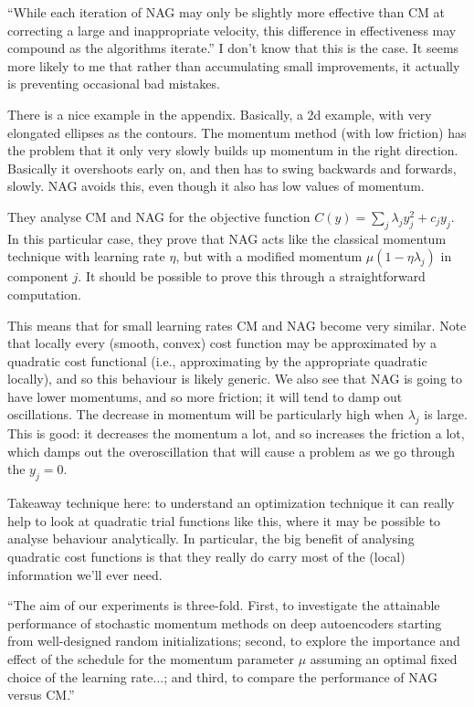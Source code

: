 \documentclass[12pt]{report}
\begin{document}
``While each iteration of NAG may only be slightly more effective than
CM at correcting a large and inappropriate velocity, this difference
in effectiveness may compound as the algorithms iterate.''  I don't
know that this is the case.  It seems more likely to me that rather
than accumulating small improvements, it actually is preventing
occasional bad mistakes.

There is a nice example in the appendix.  Basically, a 2d example,
with very elongated ellipses as the contours.  The momentum method
(with low friction) has the problem that it only very slowly builds up
momentum in the right direction.  Basically it overshoots early on,
and then has to swing backwards and forwards, slowly.  NAG avoids
this, even though it also has low values of momentum.

They analyse CM and NAG for the objective function $C(y) = \sum_j
\lambda_j y_j^2+ c_j y_j$.  In this particular case, they prove that
NAG acts like the classical momentum technique with learning rate
$\eta$, but with a modified momentum $\mu(1-\eta \lambda_j)$ in
component $j$.  It should be possible to prove this through a
straightforward computation.

This means that for small learning rates CM and NAG become very
similar.  Note that locally every (smooth, convex) cost function may
be approximated by a quadratic cost functional (i.e., approximating by
the appropriate quadratic locally), and so this behaviour is likely
generic.  We also see that NAG is going to have lower momentums, and
so more friction; it will tend to damp out oscillations.  The decrease
in momentum will be particularly high when $\lambda_j$ is large.  This
is good: it decreases the momentum a lot, and so increases the
friction a lot, which damps out the overoscillation that will cause a
problem as we go through the $y_j = 0$.

Takeaway technique here: to understand an optimization technique it
can really help to look at quadratic trial functions like this, where
it may be possible to analyse behaviour analytically.  In particular,
the big benefit of analysing quadratic cost functions is that they
really do carry most of the (local) information we'll ever need.

``The aim of our experiments is three-fold.  First, to investigate the
attainable performance of stochastic momentum methods on deep
autoencoders starting from well-designed random initializations;
second, to explore the importance and effect of the schedule for the
momentum parameter $\mu$ assuming an optimal fixed choice of the
learning rate...; and third, to compare the performance of NAG versus
CM.''
\end{document}
